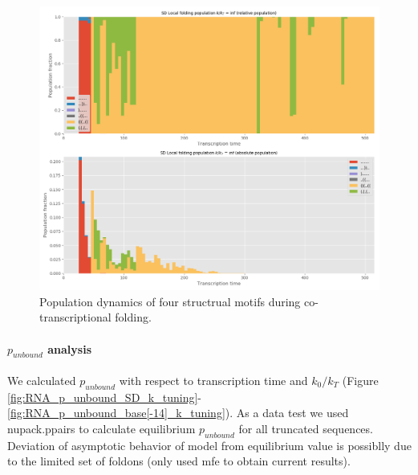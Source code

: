 \documentclass[11pt, a4paper]{article}
\begin{document}
\begin{figure}[tph]
\centering
\includegraphics[width=\textwidth]{RNA_local_population_evolution_summary}
\caption[Population dynamics]{\small Population dynamics of four structrual motifs during co-transcriptional folding.}
\label{fig:populations}
\end{figure}

\paragraph{$p_{unbound}$ analysis} We calculated $p_{unbound}$ with respect to transcription time and $k_0/k_T$ (Figure \ref{fig:RNA_p_unbound_SD_k_tuning}-\ref{fig:RNA_p_unbound_base[-14]_k_tuning}). As a data test we used nupack.ppairs to calculate equilibrium $p_{unbound }$ for all truncated sequences. Deviation of asymptotic behavior of model from equilibrium value is possiblly due to the limited set of foldons (only used mfe to obtain current results).
\end{document}
